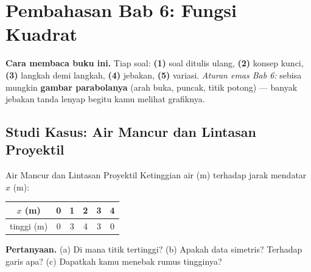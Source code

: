 
\renewcommand{\babjudul}{Pembahasan Latihan — Bab 6}


\setcounter{chapter}{6}

\chapter*{Pembahasan Bab 6: Fungsi Kuadrat}

\begin{tips}
\textbf{Cara membaca buku ini.} Tiap soal: \textbf{(1)} soal ditulis ulang,
\textbf{(2)} konsep kunci, \textbf{(3)} langkah demi langkah, \textbf{(4)}
jebakan, \textbf{(5)} variasi. \emph{Aturan emas Bab 6:} sebisa mungkin
\textbf{gambar parabolanya} (arah buka, puncak, titik potong) --- banyak jebakan
tanda lenyap begitu kamu melihat grafiknya.
\end{tips}

\section*{Studi Kasus: Air Mancur dan Lintasan Proyektil}

\begin{studikasus}{Air Mancur dan Lintasan Proyektil}
Ketinggian air (m) terhadap jarak mendatar $x$ (m):
\begin{center}
\begin{tabular}{c|ccccc}
\toprule
$x$ (m) & 0 & 1 & 2 & 3 & 4 \\ \midrule
tinggi (m) & 0 & 3 & 4 & 3 & 0 \\ \bottomrule
\end{tabular}
\end{center}
\textbf{Pertanyaan.} (a) Di mana titik tertinggi? (b) Apakah data simetris?
Terhadap garis apa? (c) Dapatkah kamu menebak rumus tingginya?
\end{studikasus}


